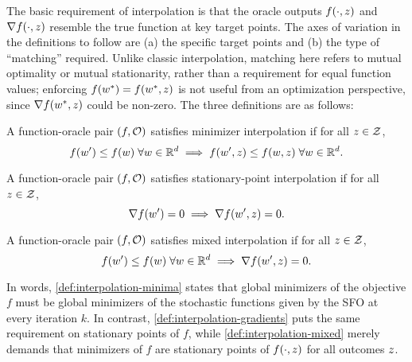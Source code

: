 The basic requirement of interpolation is that the oracle outputs \( f(\cdot, \z) \) and \( \grad(\cdot, \z) \) resemble the true function at key target points.  
The axes of variation in the definitions to follow are (a) the specific target points and (b) the type of ``matching'' required.
Unlike classic interpolation, matching here refers to mutual optimality or mutual stationarity, rather than a requirement for equal function values; 
enforcing \( f(\wopt) = f(\wopt, \z) \) is not useful from an optimization perspective, since \( \grad(\wopt, \z) \) could be non-zero.
The three definitions are as follows:

\begin{definition}\label{def:interpolation-minima}
    A function-oracle pair \( (f, \oracle{}) \) satisfies minimizer interpolation if for all \( \z \in \calZ \),
    \[ f(\w') \leq f(\w) \; \forall \w \in \R^d \implies f(\w', \z) \leq f(\w, \z) \; \forall \w \in \R^d.  \]
\end{definition}
\begin{definition}\label{def:interpolation-gradients}
    A function-oracle pair \( (f, \oracle{}) \) satisfies stationary-point interpolation if for all \( \z \in \calZ \),
    \[ \grad(\w') = 0 \implies \grad(\w', \z) = 0. \]
\end{definition}
\begin{definition}\label{def:interpolation-mixed}
    A function-oracle pair \( (f, \oracle{}) \) satisfies mixed interpolation if for all \( \z \in \calZ \),
    \[ f(\w') \leq f(\w) \; \forall \w \in \R^d \implies \grad(\w', \z) = 0. \]
\end{definition}
In words, \autoref{def:interpolation-minima} states that global minimizers of the objective \( f \) must be global minimizers of the stochastic functions given by the \ac{SFO} at every iteration \( k \).
In contrast, \autoref{def:interpolation-gradients} puts the same requirement on stationary points of \( f \), while \autoref{def:interpolation-mixed} merely demands that minimizers of \( f \) are stationary points of \( f(\cdot, \z) \) for all outcomes \( \z \).

